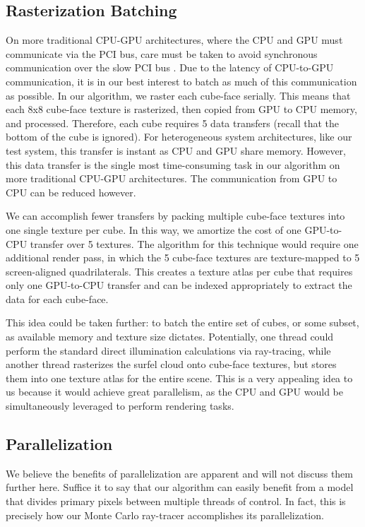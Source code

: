 \subsection{Rasterization Batching}
\label{sec:batching}
On more traditional CPU-GPU architectures, where the CPU and GPU must communicate via the PCI bus, care must be taken to avoid synchronous communication over the slow PCI bus \cite{bib:pci_press}. Due to the latency of CPU-to-GPU communication, it is in our best interest to batch as much of this communication as possible. In our algorithm, we raster each cube-face serially. This means that each 8x8 cube-face texture is rasterized, then copied from GPU to CPU memory, and processed. Therefore, each cube requires 5 data transfers (recall that the bottom of the cube is ignored). For heterogeneous system architectures, like our test system, this transfer is instant as CPU and GPU share memory. However, this data transfer is the single most time-consuming task in our algorithm on more traditional CPU-GPU architectures. The communication from GPU to CPU can be reduced however.

We can accomplish fewer transfers by packing multiple cube-face textures into one single texture per cube. In this way, we amortize the cost of one GPU-to-CPU transfer over 5 textures. The algorithm for this technique would require one additional render pass, in which the 5 cube-face textures are texture-mapped to 5 screen-aligned quadrilaterals. This creates a texture atlas per cube that requires only one GPU-to-CPU transfer and can be indexed appropriately to extract the data for each cube-face.

This idea could be taken further: to batch the entire set of cubes, or some subset, as available memory and texture size dictates. Potentially, one thread could perform the standard direct illumination calculations via ray-tracing, while another thread rasterizes the surfel cloud onto cube-face textures, but stores them into one texture atlas for the entire scene. This is a very appealing idea to us because it would achieve great parallelism, as the CPU and GPU would be simultaneously leveraged to perform rendering tasks.

\subsection{Parallelization}
We believe the benefits of parallelization are apparent and will not discuss them further here. Suffice it to say that our algorithm can easily benefit from a model that divides primary pixels between multiple threads of control. In fact, this is precisely how our Monte Carlo ray-tracer accomplishes its parallelization. 


